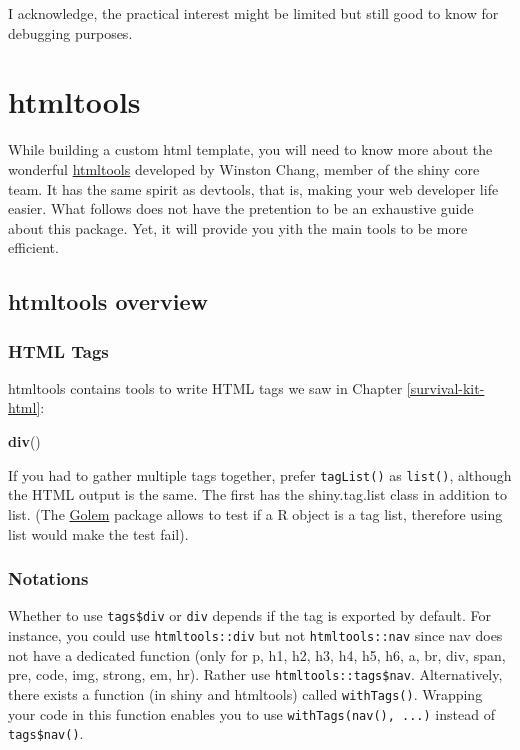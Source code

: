 \documentclass[]{book}
\newenvironment{Shaded}{\begin{snugshade}}{\end{snugshade}}
\newcommand{\KeywordTok}[1]{\textcolor[rgb]{0.13,0.29,0.53}{\textbf{#1}}}
\newcommand{\NormalTok}[1]{#1}
\begin{document}
I acknowledge, the practical interest might be limited but still good to know for debugging purposes.

\hypertarget{part-htmltools}{%
\part*{htmltools}\label{part-htmltools}}

While building a custom html template, you will need to know more about the wonderful \href{https://github.com/rstudio/htmltools}{htmltools} developed by Winston Chang, member of the shiny core team. It has the same spirit as devtools, that is, making your web developer life easier. What follows does not have the pretention to be an exhaustive guide about this package. Yet, it will provide you yith the main tools to be more efficient.

\hypertarget{htmltools-overview}{%
\chapter{htmltools overview}\label{htmltools-overview}}

\hypertarget{html-tags}{%
\section{HTML Tags}\label{html-tags}}

htmltools contains tools to write HTML tags we saw in Chapter \ref{survival-kit-html}:

\begin{Shaded}
\begin{Highlighting}[]
\KeywordTok{div}\NormalTok{()}
\end{Highlighting}
\end{Shaded}

If you had to gather multiple tags together, prefer \texttt{tagList()} as \texttt{list()}, although the HTML output is the same. The first has the shiny.tag.list class in addition to list. (The \href{http://golemverse.org}{Golem} package allows to test if a R object is a tag list, therefore using list would make the test fail).

\hypertarget{notations}{%
\section{Notations}\label{notations}}

Whether to use \texttt{tags\$div} or \texttt{div} depends if the tag is exported by default.
For instance, you could use \texttt{htmltools::div} but not \texttt{htmltools::nav} since nav does not have a dedicated function (only for p, h1, h2, h3, h4, h5, h6, a, br, div, span, pre, code, img, strong, em, hr).
Rather use \texttt{htmltools::tags\$nav}. Alternatively, there exists a function (in shiny and htmltools)
called \texttt{withTags()}. Wrapping your code in this function enables you to use \texttt{withTags(nav(),\ ...)}
instead of \texttt{tags\$nav()}.
\end{document}
